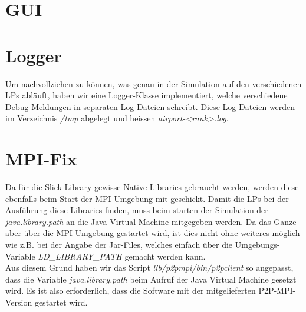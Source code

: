 \documentclass[oneside,DIV12,BCOR0.5cm,bibliography=totoc]{template}
\begin{document}
\begin{empfile}
\section{GUI}

\section{Logger}

Um nachvollziehen zu können, was genau in der Simulation auf den
verschiedenen LPs abläuft, haben wir eine Logger-Klasse implementiert,
welche verschiedene Debug-Meldungen in separaten Log-Dateien
schreibt. Diese Log-Dateien werden im Verzeichnis \emph{/tmp} abgelegt
und heissen \emph{airport-<rank>.log}.

\section{MPI-Fix}

Da für die Slick-Library gewisse Native Libraries gebraucht werden,
werden diese ebenfalls beim Start der MPI-Umgebung mit geschickt. Damit
die LPs bei der Ausführung diese Libraries finden, muss beim starten
der Simulation der \emph{java.library.path} an die Java Virtual
Machine mitgegeben werden. Da das Ganze aber über die MPI-Umgebung
gestartet wird, ist dies nicht ohne weiteres möglich wie z.B. bei
der Angabe der Jar-Files, welches einfach über die Umgebungs-Variable
\emph{LD\_LIBRARY\_PATH} gemacht werden kann.\\

Aus diesem Grund haben wir das Script \emph{lib/p2pmpi/bin/p2pclient}
so angepasst, dass die Variable \emph{java.library.path} beim Aufruf
der Java Virtual Machine gesetzt wird. Es ist also erforderlich, dass
die Software mit der mitgelieferten P2P-MPI-Version gestartet wird.


\end{empfile}
\end{document}
